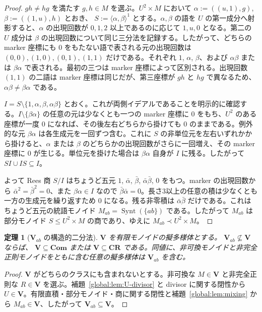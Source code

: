 \documentclass[10pt,a4paper]{ltjsarticle}
\newtheorem{theorem}{定理}[section]
\theoremstyle{definition}
\theoremstyle{remark}
\begin{document}
\begin{proof}
$gh\ne hg$ を満たす $g,h\in M$ を選ぶ。$U^2\times M$ において
\(\alpha:=((u,1),g)\), \(\beta:=((1,u),h)\)
とおき、
\(S:=\langle\alpha,\beta\rangle^1\)
とする。$\alpha,\beta$ の語を $U$ の第一成分へ射影すると、$\alpha$ の出現回数が $0,1,2$ 以上であるのに応じて $1,u,0$ となる。第二の $U$ 成分は $\beta$ の出現回数について同じ三分法を記録する。したがって、どちらの marker 座標にも $0$ をもたない語で表される元の出現回数は
$(0,0),(1,0),(0,1),(1,1)$
だけである。それぞれ $1$, $\alpha$, $\beta$、および $\alpha\beta$ または $\beta\alpha$ で表される。最初の三つは marker 座標によって区別される。出現回数 $(1,1)$ の二語は marker 座標は同じだが、第三座標が $gh$ と $hg$ で異なるため、$\alpha\beta\ne\beta\alpha$ である。

\(
I=S\setminus\{1,\alpha,\beta,\alpha\beta\}
\)
とおく。これが両側イデアルであることを明示的に確認する。$I\setminus\{\beta\alpha\}$ の任意の元は少なくとも一つの marker 座標に $0$ をもち、$U^2$ のある座標が一度 $0$ になれば、その後左右どちらから掛けても $0$ のままである。例外的な元 $\beta\alpha$ は各生成元を一回ずつ含む。これに $S$ の非単位元を左右いずれかから掛けると、$\alpha$ または $\beta$ のどちらかの出現回数がさらに一回増え、その marker 座標に $0$ が生じる。単位元を掛けた場合は $\beta\alpha$ 自身が $I$ に残る。したがって $SI\cup IS\subseteq I$。

よって Rees 商 $S/I$ はちょうど五元
$1$, $\bar\alpha$, $\bar\beta$, $\bar\alpha\bar\beta$, $0$
をもつ。marker の出現回数から
\(\bar\alpha^2=\bar\beta^2=0\)、また $\beta\alpha\in I$ なので
\(\bar\beta\bar\alpha=0\)。長さ3以上の任意の積は少なくとも一方の生成元を繰り返すため $0$ になる。残る非零積は $\bar\alpha\bar\beta$ だけである。これはちょうど五元の統語モノイド
\(M_{ab}=\operatorname{Synt}(\{ab\})\)
である。したがって $M_{ab}$ は部分モノイド $S\le U^2\times M$ の商であり、ゆえに
$M_{ab}\prec U^2\times M$。
\end{proof}

\begin{theorem}[\(\mathbf V_{ab}\) の構造的二分法]
\label{global:thm:structural}
\(\mathbf V\) を有限モノイドの擬多様体とする。
\(\mathbf V_{ab}\not\subseteq\mathbf V\)
ならば、
\(\mathbf V\subseteq\mathbf{Com}\)
または
\(\mathbf V\subseteq\mathbf{CR}\)
である。同値に、非可換モノイドと非完全正則モノイドをともに含む任意の擬多様体は \(\mathbf V_{ab}\) を含む。
\end{theorem}

\begin{proof}
$\mathbf V$ がどちらのクラスにも含まれないとする。非可換な $M\in\mathbf V$ と非完全正則な $R\in\mathbf V$ を選ぶ。補題~\ref{global:lem:U-divisor} と divisor に関する閉性から $U\in\mathbf V$。有限直積・部分モノイド・商に関する閉性と補題~\ref{global:lem:mixing} から $M_{ab}\in\mathbf V$、したがって
$\mathbf V_{ab}\subseteq\mathbf V$。
\end{proof}
\end{document}
